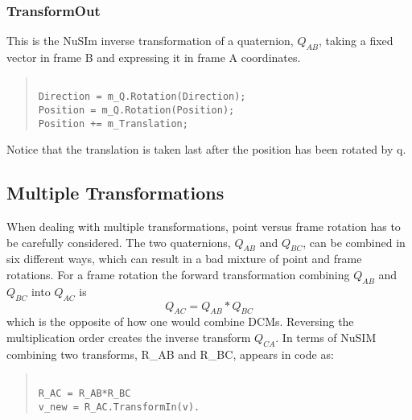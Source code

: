 \subsubsection{TransformOut}
This is the NuSIm inverse transformation of a quaternion, $Q_{AB}$, taking a fixed vector in frame B and expressing it in frame A coordinates.
\begin{quotation}
\begin{verbatim}

Direction = m_Q.Rotation(Direction);
Position = m_Q.Rotation(Position);   
Position += m_Translation;
\end{verbatim}
\end{quotation}
Notice that the translation is taken last after the position has been rotated by q.



\subsection{Multiple Transformations}
When dealing with multiple transformations, point versus frame rotation has to be carefully considered. The two quaternions, $Q_{AB}$ and $Q_{BC}$, can be combined in six different ways, which can result in a bad mixture of point and frame rotations. For a frame rotation the forward transformation combining $Q_{AB}$ and $Q_{BC}$ into $Q_{AC}$ is
\begin{equation}
Q_{AC} = Q_{AB}*Q_{BC}
\end{equation} 
which is the opposite of how one would combine DCMs. Reversing the multiplication order creates the inverse transform $Q_{CA}$. In terms of NuSIM combining two transforms, R\_AB and R\_BC, appears in code as:
\begin{quotation}
\begin{verbatim}

R_AC = R_AB*R_BC
v_new = R_AC.TransformIn(v).
\end{verbatim}
\end{quotation} 

